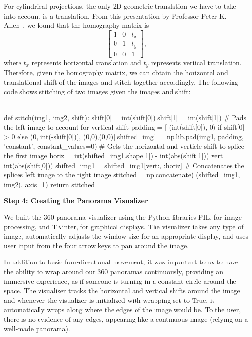 \documentclass[10pt,twocolumn,letterpaper]{article}
\begin{document}
For cylindrical projections, the only 2D geometric translation we have to take into account is a translation. From this presentation by Professor Peter K. Allen~\cite{seitz}, we found that the homography matrix is 
\[
  \left[ {\begin{array}{ccc}
   1 & 0 & t_x\\
   0 & 1 & t_y\\
   0 & 0 & 1
  \end{array} } \right],
\]
where $t_x$ represents horizontal translation and $t_y$ represents vertical translation. Therefore, given the homography matrix, we can obtain the horizontal and translational shift of the images and stitch together accordingly. The following code shows stitching of two images given the images and shift:\\\\
\begin{python}
def stitch(img1, img2, shift):
    shift[0] = int(shift[0])
    shift[1] = int(shift[1])
    # Pads the left image to account for 
    vertical shift
    padding = [ (int(shift[0]), 0) 
        if shift[0] > 0 
        else (0, int(-shift[0])),
        (0,0),(0,0)]
    shifted_img1 = np.lib.pad(img1, padding, 
        'constant', constant_values=0)
    # Gets the horizontal and verticle shift 
    to splice the first image
    horiz = int(shifted_img1.shape[1]) - 
        int(abs(shift[1]))
    vert = int(abs(shift[0]))
    shifted_img1 = shifted_img1[vert:, :horiz]
    # Concatenates the splices left image 
    to the right image
    stitched = np.concatenate(
        (shifted_img1, img2), axis=1)
    return stitched
\end{python}

\bigskip
\noindent\textbf{Step 4: Creating the Panorama Visualizer}

We built the 360 panorama visualizer using the Python libraries PIL, for image processing, and TKinter, for graphical displays. The visualizer takes any type of image, automatically adjusts the window size for an appropriate display, and uses user input from the four arrow keys to pan around the image.

In addition to basic four-directional movement, it was important to us to have the ability to wrap around our 360 panoramas continuously, providing an immersive experience, as if someone is turning in a constant circle around the space. The visualizer tracks the horizontal and vertical shifts around the image and whenever the visualizer is initialized with wrapping set to True, it automatically wraps along where the edges of the image would be. To the user, there is no evidence of any edges, appearing like a continuous image (relying on a well-made panorama).
\end{document}
